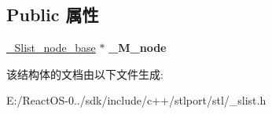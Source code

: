 \subsection*{Public 属性}
\begin{DoxyCompactItemize}
\item 
\mbox{\label{struct___slist__iterator__base_a6077f233b1049ba27aabc8aadb2c8f20}} 
\hyperlink{struct___slist__node__base}{\+\_\+\+Slist\+\_\+node\+\_\+base} $\ast$ {\bfseries \+\_\+\+M\+\_\+node}
\end{DoxyCompactItemize}


该结构体的文档由以下文件生成\+:\begin{DoxyCompactItemize}
\item 
E\+:/\+React\+O\+S-\/0../sdk/include/c++/stlport/stl/\+\_\+slist.\+h\end{DoxyCompactItemize}
